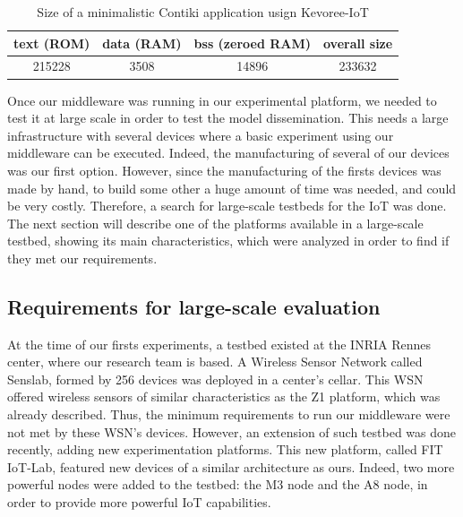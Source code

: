 \begin{table}[htb]
	\centering
	\caption{Size of a minimalistic Contiki application usign Kevoree-IoT}
	\label{tab:kevoreeContiki}
	\begin{tabular}{|c|c|c|c|}
		\hline
		\textbf{text (ROM)}   & \textbf{data (RAM)} & \textbf{bss (zeroed RAM)} & \textbf{overall size} \\ \hline
		215228 & 3508 & 14896 & 233632 \\ \hline     
	\end{tabular}
\end{table}


Once our middleware was running in our experimental platform, we needed to test it at large scale in order to test the model dissemination.
This needs a large infrastructure with several devices where a basic experiment using our middleware can be executed.
Indeed, the manufacturing of several of our devices was our first option.
However, since the manufacturing of the firsts devices was made by hand, to build some other a huge amount of time was needed, and could be very costly.
Therefore, a search for large-scale testbeds for the IoT was done.
The next section will describe one of the platforms available in a large-scale testbed, showing its main characteristics, which were analyzed in order to find if they met our requirements.

\subsection{Requirements for large-scale evaluation}
\label{sec:iotlab}
At the time of our firsts experiments, a testbed existed at the INRIA Rennes center, where our research team is based.
A Wireless Sensor Network called Senslab\cite{des2011senslab}, formed by 256 devices was deployed in a center's cellar.
This WSN offered wireless sensors of similar characteristics as the Z1 platform, which was already described.
Thus, the minimum requirements to run our middleware were not met by these WSN's devices.
However, an extension of such testbed was done recently, adding new experimentation platforms.
This new platform, called FIT IoT-Lab\cite{Fleury15iotlab}, featured new devices of a similar architecture as ours.
Indeed, two more powerful nodes were added to the testbed: the M3 node and the A8 node, in order to provide more powerful IoT capabilities.


